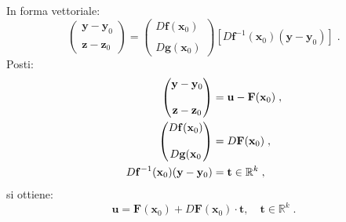 \documentclass[a4paper,12pt]{report}
\theoremstyle{plain}
\theoremstyle{definition}
\theoremstyle{remark}
\numberwithin{equation}{section}
\begin{document}
In forma vettoriale:
\begin{equation}
\left(\begin{matrix}
       \mathbf{y}-\mathbf{y}_0 \\
\\
\mathbf{z}-\mathbf{z}_0
      \end{matrix}\right)=\left(\begin{matrix}
D\mathbf{f}(\mathbf{x}_0) \\
\\
D\mathbf{g}(\mathbf{x}_0)\end{matrix}\right)\left[D\mathbf{f}^{-1}(\mathbf{x}_0)(\mathbf{y}-\mathbf{y}_0)\right]\;.
\end{equation}
Posti:
\begin{align}
\begin{pmatrix}
\mathbf{y}-\mathbf{y}_0 \\
\\
\mathbf{z}-\mathbf{z}_0
\end{pmatrix}&= \mathbf{u}-\mathbf{F}(\mathbf{x}_0)\;, \notag \\
\begin{pmatrix}
D\mathbf{f}(\mathbf{x}_0) \\
\\
D\mathbf{g}(\mathbf{x}_0
\end{pmatrix}&=D\mathbf{F}(\mathbf{x}_0)\;, \notag \\
D\mathbf{f}^{-1}(\mathbf{x}_0)(\mathbf{y}-\mathbf{y}_0)&=\mathbf{t}\in\mathbb{R}^k\;,
\end{align}
si ottiene:
\begin{equation}
\mathbf{u}=\mathbf{F}(\mathbf{x}_0)+D\mathbf{F}(\mathbf{x}_0)\cdot\mathbf{t},\quad \mathbf{t}\in\mathbb{R}^k\;.
\end{equation}
\endproof
\end{document}
